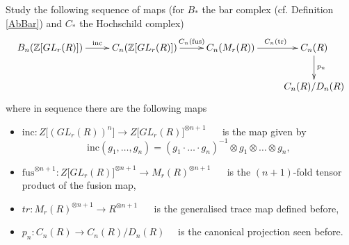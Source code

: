 

\label{tracing}
Study the following sequence of maps (for $B_*$ the bar complex (cf. Definition \ref{AbBar}) and $C_*$ the Hochschild complex)
$$\xymatrix{
B_n(\Z\lbrack GL_r(R)\rbrack) \ar[r]^{\mathrm{inc}} &
 C_n(\Z\lbrack GL_r(R) \rbrack)  \ar[r]^-{C_n(\mathrm{fus})}
 &C_n(M_r(R)) \ar[r]^{~~C_n(\mathrm{tr})} &
 C_n(R) \ar[d]^-{p_n} \\ & & & C_n(R)/D_n(R)
}$$
where in sequence there are the following maps
\begin{itemize}
\item $\mathrm{inc} \colon Z\lbrack (GL_r(R))^n\rbrack \rightarrow Z\lbrack GL_r(R)\rbrack^{\otimes n+1}$ ~~ is the map given by $$\mathrm{inc}(g_1,\ldots,g_n) = (g_1\cdot \ldots \cdot g_n)^{-1}\otimes g_1 \otimes \ldots \otimes g_n,$$
\item $\mathrm{fus}^{\otimes n+1}\colon Z\lbrack GL_r(R) \rbrack^{\otimes n+1} \rightarrow M_r(R)^{\otimes n+1}$ ~~ is the $(n+1)$-fold tensor product of the fusion map,
\item $tr \colon M_r(R)^{\otimes n+1} \rightarrow R^{\otimes n+1}$ ~~ is the generalised trace map defined before,
\item $p_n \colon C_n(R) \rightarrow C_n(R)/D_n(R)$ ~~is the canonical projection seen before.
\end{itemize}

